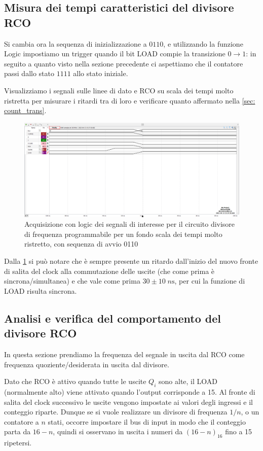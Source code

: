 \documentclass[10pt, a4paper, italian]{article}
\begin{document}
\subsection{Misura dei tempi caratteristici del divisore RCO}
Si cambia ora la sequenza di inizializzazione a $0110$, e utilizzando la
funzione Logic impostiamo un trigger quando il bit LOAD compie la transizione
$0 \to 1$: in seguito a quanto visto nella sezione precedente ci aspettiamo
che il contatore passi dallo stato $1111$ allo stato iniziale.

Visualizziamo i segnali sulle linee di dato e RCO su scala dei tempi molto
ristretta per misurare i ritardi tra di loro e verificare quanto affermato
nella \cref{sec: count_trans}.
\begin{figure}[htbp]
\centering
	\includegraphics[width=\textwidth]{5.f_0110_20ns}
	\caption{Acquisizione con logic dei segnali di interesse per il circuito
	divisore di frequenza programmabile per un fondo scala dei tempi
	molto ristretto, con sequenza di avvio 0110
	\label{fig: count_20ns}}
\end{figure}
Dalla \cref{fig: count_20ns} si può notare che è sempre presente un ritardo
dall'inizio del nuovo fronte di salita del clock alla commutazione delle
uscite (che come prima è sincrona/simultanea) e che vale come prima
$30 \pm 10 \; \si{n\s}$, per cui la funzione di LOAD risulta sincrona.

\subsection{Analisi e verifica del comportamento del divisore RCO}
In questa sezione prendiamo la frequenza del segnale in uscita dal RCO come
frequenza quoziente/desiderata in uscita dal divisore.

Dato che RCO è attivo quando tutte le uscite $Q_i$ sono alte, il LOAD
(normalmente alto) viene attivato quando l'output corrisponde a 15. Al
fronte di salita del clock successivo le uscite vengono impostate ai valori
degli ingressi e il conteggio riparte. Dunque se si vuole realizzare un
divisore di frequenza $1/n$, o un contatore a $n$ stati, occorre impostare il
bus di input in modo che il conteggio parta da $16 - n$, quindi si osservano
in uscita i numeri da $(16 - n)_{16}$ fino a 15 ripetersi.
\end{document}
